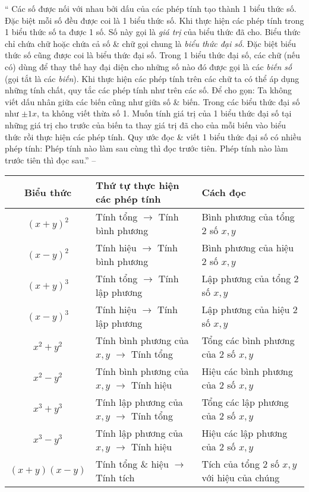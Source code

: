 \documentclass{article}
\begin{document}
`` Các số được nối với nhau bởi dấu của các phép tính tạo thành 1 biểu thức số. Đặc biệt mỗi số đều được coi là 1 biểu thức số. Khi thực hiện các phép tính trong 1 biểu thức số ta được 1 số. Số này gọi là \textit{giá trị} của biểu thức đã cho.  Biểu thức chỉ chứa chữ hoặc chứa cả số \& chữ gọi chung là \textit{biểu thức đại số}. Đặc biệt biểu thức số cũng được coi là biểu thức đại số. Trong 1 biểu thức đại số, các chữ (nếu có) dùng để thay thế hay đại diện cho những số nào đó được gọi là các \textit{biến số} (gọi tắt là các \textit{biến}). Khi thực hiện các phép tính trên các chữ ta có thể áp dụng những tính chất, quy tắc các phép tính như trên các số.  Để cho gọn: Ta không viết dấu nhân giữa các biến cũng như giữa số \& biến. Trong các biểu thức đại số như $\pm1x$, ta không viết thừa số 1.  Muốn tính giá trị của 1 biểu thức đại số tại những giá trị cho trước của biến ta thay giá trị đã cho của mỗi biến vào biểu thức rồi thực hiện các phép tính.  Quy ước đọc \& viết 1 biểu thức đại số có nhiều phép tính: Phép tính nào làm sau cùng thì đọc trước tiên. Phép tính nào làm trước tiên thì đọc sau.'' -- \cite[Chap. III, \S1, p. 37]{Tuyen_Toan_7}
\begin{table}[H]
	\centering
	\begin{tabular}{|c|l|l|}
		\hline
		\textbf{Biểu thức} & \textbf{Thứ tự thực hiện các phép tính} & \textbf{Cách đọc}\\
		\hline
		$(x + y)^2$ & Tính tổng $\to$ Tính bình phương & Bình phương của tổng 2 số $x,y$\\
		\hline
		$(x - y)^2$ & Tính hiệu $\to$ Tính bình phương & Bình phương của hiệu 2 số $x,y$\\
		\hline
		$(x + y)^3$ & Tính tổng $\to$ Tính lập phương & Lập phương của tổng 2 số $x,y$ \\
		\hline		
		$(x - y)^3$ & Tính hiệu $\to$ Tính lập phương & Lập phương của hiệu 2 số $x,y$ \\
		\hline
		$x^2 + y^2$ & Tính bình phương của $x,y$ $\to$ Tính tổng & Tổng các bình phương của 2 số $x,y$\\
		\hline
		$x^2 - y^2$ & Tính bình phương của $x,y$ $\to$ Tính hiệu & Hiệu các bình phương của 2 số $x,y$\\
		\hline
		$x^3 + y^3$ & Tính lập phương của $x,y$ $\to$ Tính tổng & Tổng các lập phương của 2 số $x,y$\\
		\hline
		$x^3 - y^3$ & Tính lập phương của $x,y$ $\to$ Tính hiệu & Hiệu các lập phương của 2 số $x,y$\\
		\hline
		$(x + y)(x - y)$ & Tính tổng \& hiệu $\to$ Tính tích & Tích của tổng 2 số $x,y$ với hiệu của chúng\\
		\hline
	\end{tabular}
\end{table}
\end{document}
